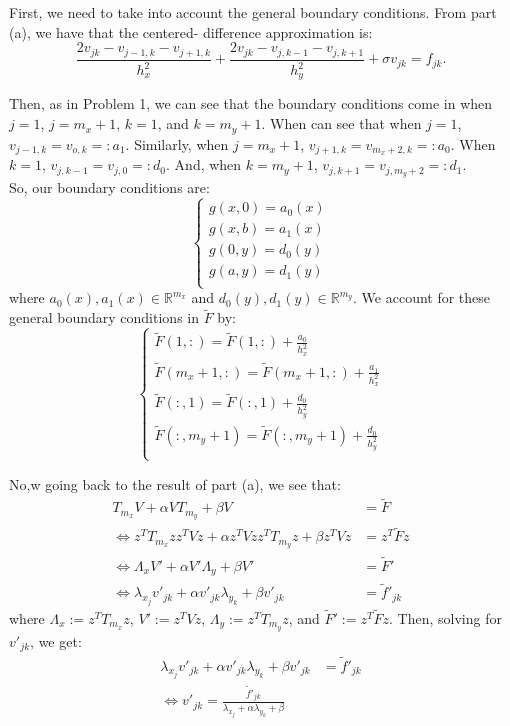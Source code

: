 \documentclass[12pt]{article}
\def\R{\mathbb{R}}
\begin{document}
\begin{itemize}
First, we need to take into account the general boundary conditions.  From part (a), we have that the centered- difference approximation is:
$$\frac{2v_{jk} - v_{j-1,k} - v_{j+1,k}}{h_x^2} + \frac{2v_{jk} - v_{j,k-1} - v_{j,k+1}}{h_y^2} +\sigma v_{jk} = f_{jk}.$$

Then, as in Problem 1, we can see that the boundary conditions come in when $j=1$, $j=m_x + 1$, $k=1$, and $k=m_y + 1$.  When can see that when $j=1$, $v_{j-1,k} = v_{o,k} =: a_1$.  Similarly, when $j=m_x + 1$, $v_{j+1,k} = v_{m_x +2,k} =: a_0$.  When $k=1$, $v_{j,k-1} = v_{j,0} =: d_0$.  And, when $k=m_y + 1$, $v_{j,k+1} = v_{j,m_y + 2} =: d_1$.\\
So, our boundary conditions are:
\[\begin{cases}
g(x,0) = a_0(x) \\
g(x,b) = a_1(x) \\
g(0,y) = d_0(y) \\
g(a,y) = d_1(y) \\
\end{cases}\]
where $a_0(x), a_1(x) \in \R^{m_x}$ and $d_0(y), d_1(y) \in \R^{m_y}$.  We account for these general boundary conditions in $\tilde{F}$ by:
\[\begin{cases}
\tilde{F}(1,:) = \tilde{F}(1,:) + \frac{a_0}{h_x^2} \\
\tilde{F}(m_x + 1,:) = \tilde{F}(m_x + 1,:) + \frac{a_1}{h_x^2} \\
\tilde{F}(:,1) = \tilde{F}(:,1) + \frac{d_0}{h_y^2} \\
\tilde{F}(:,m_y + 1) = \tilde{F}(:,m_y + 1) + \frac{d_0}{h_y^2} \\
\end{cases}\]

No,w going back to the result of part (a), we see that:
\begin{align}
T_{m_x}V + \alpha VT_{m_y} + \beta V &= \tilde{F} \nonumber \\
\iff z^TT_{m_x}zz^TVz + \alpha z^TVzz^TT_{m_y}z + \beta z^TVz &= z^T\tilde{F}z \nonumber \\
\iff \Lambda_x V' + \alpha V'\Lambda_y + \beta V' &= \tilde{F}' \nonumber \\
\iff \lambda_{x_j}v'_{jk} + \alpha v'_{jk}\lambda_{y_k} + \beta v'_{jk} &= \tilde{f}'_{jk} \nonumber 
\end{align}
where $\Lambda_x := z^TT_{m_x}z$, $V' := z^TVz$, $\Lambda_y := z^TT_{m_y}z$, and $\tilde{F}' := z^T\tilde{F}z$.  Then, solving for $v'_{jk}$, we get:
\begin{align}
\lambda_{x_j}v'_{jk} + \alpha v'_{jk}\lambda_{y_k} + \beta v'_{jk} &= \tilde{f}'_{jk} \nonumber \\
\iff v'_{jk} = \frac{\tilde{f}'_{jk}}{\lambda_{x_j} + \alpha \lambda_{y_k} + \beta} \nonumber
\end{align}


\end{itemize}
\end{document}
